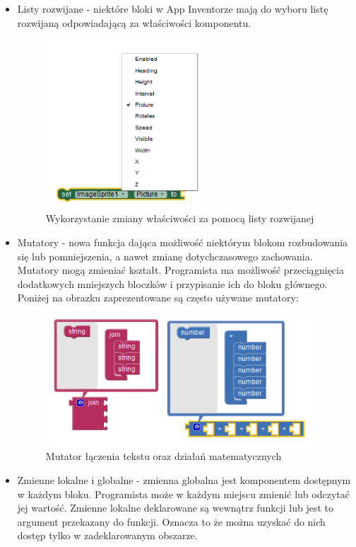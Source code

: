 \begin{itemize}
\item Listy rozwijane - niektóre bloki w App Inventorze mają do wyboru listę rozwijaną odpowiadającą za właściwości komponentu.\cite{android:44} 
\begin{figure}[H] 
\centering\includegraphics[width=6cm]{figures/dropdowns}
\caption{Wykorzystanie zmiany właściwości za pomocą listy rozwijanej}
\end{figure}

\item Mutatory - nowa funkcja dająca możliwość niektórym blokom rozbudowania się lub pomniejszenia, a nawet zmianę dotychczasowego zachowania. Mutatory mogą zmieniać kształt. Programista ma możliwość przeciągnięcia dodatkowych mniejszych bloczków i przypisanie ich do bloku głównego.\cite{android:45} Poniżej na obrazku zaprezentowane są często używane mutatory:

\begin{figure}[H] 
\centering\includegraphics[width=10cm]{figures/mutators}
\caption{Mutator łączenia tekstu oraz działań matematycznych}
\end{figure}

\item Zmienne lokalne i globalne - zmienna globalna jest komponentem dostępnym w każdym bloku. Programista może w każdym miejscu zmienić lub odczytać jej wartość. Zmienne lokalne deklarowane są wewnątrz funkcji lub jest to argument przekazany do funkcji. Oznacza to że można uzyskać do nich dostęp tylko w zadeklarowanym obszarze.\cite{android:46}


\end{itemize}
